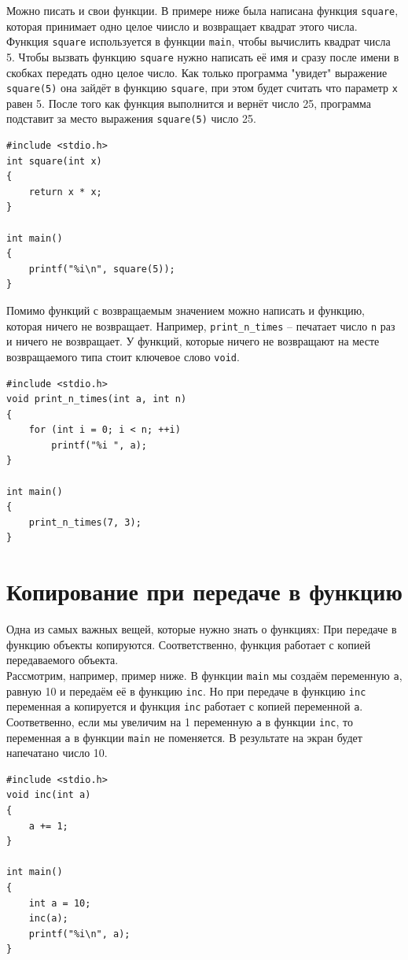\documentclass{article}
\begin{document}
Можно писать и свои функции. В примере ниже была написана функция \texttt{square}, которая принимает одно целое чиисло и возвращает квадрат этого числа. Функция \texttt{square} используется в функции \texttt{main}, чтобы вычислить квадрат числа 5. Чтобы вызвать функцию \texttt{square} нужно написать её имя и сразу после имени в скобках передать одно целое число. Как только программа "увидет" выражение \texttt{square(5)} она зайдёт в функцию \texttt{square}, при этом будет считать что параметр \texttt{x} равен 5. После того как функция выполнится и вернёт число 25, программа подставит за место выражения \texttt{square(5)} число 25.
\begin{lstlisting}
#include <stdio.h>
int square(int x)
{
    return x * x;
}

int main()
{
    printf("%i\n", square(5));
}
\end{lstlisting}
Помимо функций с возвращаемым значением можно написать и функцию, которая ничего не возвращает. Например, \texttt{print\_n\_times} -- печатает число \texttt{n} раз и ничего не возвращает. У функций, которые ничего не возвращают на месте возвращаемого типа стоит ключевое слово \texttt{void}.
\begin{lstlisting}
#include <stdio.h>
void print_n_times(int a, int n) 
{
    for (int i = 0; i < n; ++i)
        printf("%i ", a);
}

int main() 
{
    print_n_times(7, 3);
}
\end{lstlisting}


\section*{Копирование при передаче в функцию}
Одна из самых важных вещей, которые нужно знать о функциях: При передаче в функцию объекты копируются.
Соответственно, функция работает с копией передаваемого объекта.\\
Рассмотрим, например, пример ниже. В функции \texttt{main} мы создаём переменную \texttt{a}, равную 10 и передаём её в функцию \texttt{inc}. Но при передаче в функцию \texttt{inc} переменная \texttt{a} копируется и функция \texttt{inc} работает с копией переменной \texttt{a}. Соответвенно, если мы увеличим на 1 переменную \texttt{a} в функции \texttt{inc}, то переменная \texttt{a} в функции \texttt{main} не поменяется. В результате на экран будет напечатано число 10.


\begin{lstlisting}
#include <stdio.h>
void inc(int a)
{
    a += 1;
}

int main()
{
    int a = 10;
    inc(a);
    printf("%i\n", a);
}
\end{lstlisting}
\end{document}
